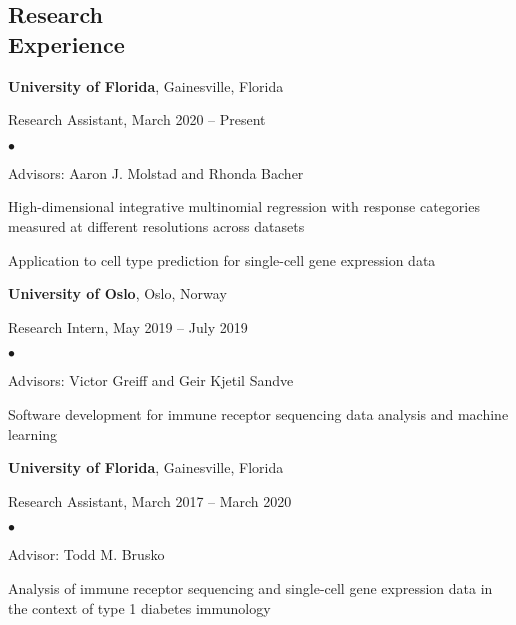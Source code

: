 \documentclass[margin,centered]{res}
\newenvironment{list1}{
  \begin{list}{\ding{113}}{%
      \setlength{\itemsep}{0in}
      \setlength{\parsep}{0in} \setlength{\parskip}{0in}
      \setlength{\topsep}{0in} \setlength{\partopsep}{0in}
      \setlength{\leftmargin}{0.17in}}}{\end{list}}
\newenvironment{list2}{
  \begin{list}{$\bullet$}{%
      \setlength{\itemsep}{0in}
      \setlength{\parsep}{0in} \setlength{\parskip}{0in}
      \setlength{\topsep}{0in} \setlength{\partopsep}{0in}
      \setlength{\leftmargin}{0.2in}}}{\end{list}}
\begin{document}
\begin{resume}
\section{\sc Research\\ Experience}
{\bf University of Florida},  Gainesville, Florida
\begin{list1}
\item[] 
Research Assistant, March 2020 -- Present
\begin{list2}
\item Advisors: Aaron J. Molstad and Rhonda Bacher
\item High-dimensional integrative multinomial regression with response categories measured at different resolutions across datasets
\item Application to cell type prediction for single-cell gene expression data
\end{list2} 
\end{list1}
\vspace*{-.1in}
{\bf University of Oslo}, Oslo, Norway
\begin{list1}
\item[] 
Research Intern, May 2019 -- July 2019
\begin{list2}
\item Advisors: Victor Greiff and Geir Kjetil Sandve
\item Software development for immune receptor sequencing data analysis and machine learning
\end{list2} 
\end{list1}
\vspace*{-.1in}
{\bf University of Florida},  Gainesville, Florida
\begin{list1}
\item[] 
Research Assistant, March 2017 -- March 2020
\begin{list2}
\item Advisor: Todd M. Brusko
\item Analysis of immune receptor sequencing and single-cell gene expression data in the context of type 1 diabetes immunology
\end{list2} 
\end{list1}


\end{resume}
\end{document}
